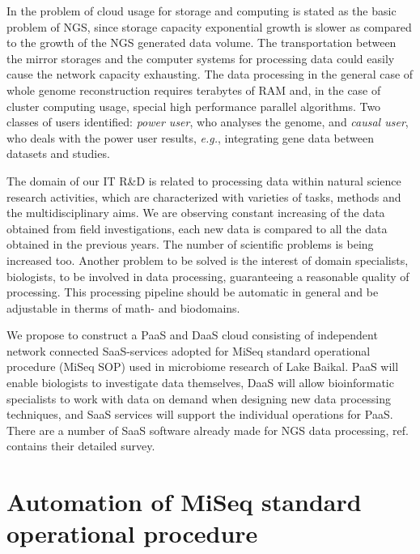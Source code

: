 \documentclass[a4paper]{jpconf}
\begin{document}
In \cite{guo16} the problem of cloud usage for storage and computing is stated as the basic problem of NGS, since storage capacity exponential growth is slower as compared to the growth of the NGS generated data volume. The transportation between the mirror storages and the computer systems for processing data could easily cause the network capacity exhausting. The data processing in the general case of whole genome reconstruction requires terabytes of RAM and, in the case of cluster computing usage, special high performance parallel algorithms. Two classes of users identified: \emph{power user}, who analyses the genome, and \emph{causal user}, who deals with the power user results, \emph{e.g.}, integrating gene data between datasets and studies.



The domain of our IT R\&D is related to processing data within natural science research activities, which are characterized with varieties of tasks, methods and the multidisciplinary aims. %
We are observing constant increasing of the data obtained from field investigations, each new data is compared to all the data obtained in the previous years. The number of scientific problems is being increased too. Another problem to be solved is the interest of domain specialists, biologists, to be involved in data processing, guaranteeing a reasonable quality of processing.  This processing pipeline should be automatic in general and be adjustable in therms of math- and biodomains.

We propose to construct a PaaS and DaaS cloud consisting of independent network connected SaaS-services adopted for MiSeq standard operational procedure (MiSeq SOP) used in microbiome research of Lake Baikal. PaaS will enable biologists to investigate data themselves, DaaS will allow bioinformatic specialists to work with data on demand when designing new data processing techniques, and SaaS services will support the individual operations for PaaS. There are a number of SaaS software already made for NGS data processing, ref.~\cite{guo16} contains their detailed survey. %


\section{Automation of MiSeq standard operational procedure}
\label{sec:sop}
\end{document}
